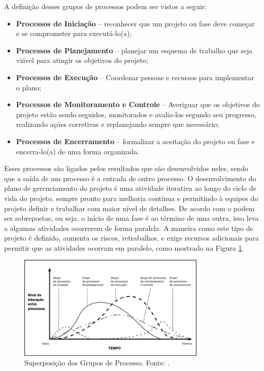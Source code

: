 A definição desses grupos de processos podem ser vistos a seguir:

\begin{itemize}
	\item \textbf{Processos de Iniciação} – reconhecer que um projeto ou fase deve começar e se comprometer para executá-lo(a);
	\item \textbf{Processos de Planejamento} – planejar um esquema de trabalho que seja viável para atingir os objetivos do projeto;
	\item \textbf{Processos de Execução} – Coordenar pessoas e recursos para implementar o plano;
	\item \textbf{Processos de Monitoramento e Controle} – Averiguar que os objetivos do projeto estão sendo seguidos, monitorados e avalia-los segundo seu progresso, realizando ações corretivas e replanejando sempre que necessário; 
	\item \textbf{Processos de Encerramento} – formalizar a aceitação do projeto ou
	fase e encerra-lo(a) de uma forma organizada.
\end{itemize}

Esses processos são ligados pelos resultados que são desenvolvidos neles, sendo que a saída de um processo é a entrada de outro processo. O desenvolvimento do plano de gerenciamento do projeto é uma atividade iterativa ao longo do ciclo de vida do projeto, sempre pronto para melhoria contínua e permitindo à equipes do projeto definir e trabalhar com maior nível de detalhes. De acordo com o  podem ser sobrepostas, ou seja, o início de uma fase é ao término de uma outra, isso leva a algumas atividades ocorrerem de forma paralela. A maneira como este tipo de projeto é definido, aumenta os riscos, retrabalhos, e exige recursos adicionais para permitir que as atividades ocorram em paralelo, como mostrado na Figura \ref{img:fases_sobrepostas}.

\begin{figure}[H]
	\centering
	\includegraphics[width=0.8\textwidth]{figuras/fases_pmbok_sobrepostas.jpg}
	\caption{Superposição dos Grupos de Processo. Fonte: .}
	\label{img:fases_sobrepostas}
\end{figure}

